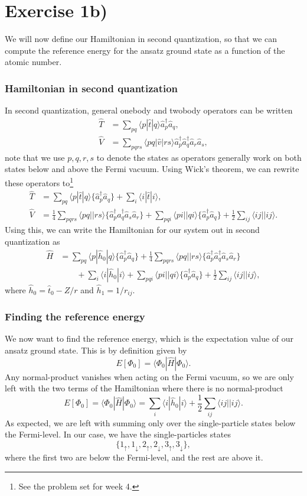 \documentclass[a4paper, 11pt, notitlepage, english]{article}
\newcommand{\brakket}[2]{\langle #1 || #2 \rangle}
\newcommand{\op}[1]{\hat{#1}}
\newcommand{\braopket}[3]{\langle #1 | {#2} | #3 \rangle}
\renewcommand{\d}{{\rm d}}
\renewcommand{\u}{\uparrow}
\renewcommand{\d}{\downarrow}
\begin{document}
\clearpage

\section*{Exercise 1b)}
We will now define our Hamiltonian in second quantization, so that we can compute the reference energy for the ansatz ground state as a function of the atomic number. 

\subsubsection*{Hamiltonian in second quantization}

In second quantization, general onebody and twobody operators can be written
\begin{align*}
\op{T} &= \sum_{pq} \braopket{p}{\op{t}}{q} \op{a}_p^\dagger \op{a}_q, \\
\op{V} &= \sum_{pqrs} \braopket{pq}{\op{v}}{rs} \op{a}_p^\dagger\op{a}_q^\dagger \op{a}_r \op{a}_s,
\end{align*}
note that we use $p,q,r,s$ to denote the states as operators generally work on both states below and above the Fermi vacuum. Using Wick's theorem, we can rewrite these operators to\footnote{See the problem set for week 4.}
\begin{align*}
\op{T} &= \sum_{pq} \braopket{p}{\op{t}}{q} \{\op{a}_p^\dagger \op{a}_q\} + \sum_i \braopket{i}{\op{t}}{i}, \\
\op{V} &= \frac{1}{4}\sum_{pqrs} \brakket{pq}{rs} \{\op{a}_p^\dag \op{a}_q^\dag \op{a}_s\op{a}_r\} + \sum_{pqi} \brakket{pi}{qi} \{ \op{a}_p^\dag \op{a}_q \} + \frac{1}{2}\sum_{ij} \brakket{ij}{ij}.
\end{align*}
Using this, we can write the Hamiltonian for our system out in second quantization as
\begin{align*}
\op{H} &= \sum_{pq} \braopket{p}{\op{h}_0}{q} \{\op{a}_p^\dagger \op{a}_q\} + \frac{1}{4}\sum_{pqrs} \brakket{pq}{rs}\{\op{a}_p^\dag \op{a}_q^\dag \op{a}_s\op{a}_r\} \\ &\qquad+ \sum_i \braopket{i}{\op{h}_0}{i} + \sum_{pqi} \brakket{pi}{qi} \{ \op{a}_p^\dag \op{a}_q \} + \frac{1}{2}\sum_{ij} \brakket{ij}{ij},
\end{align*}
where $\op{h}_0 = \op{t}_0 - Z/r$ and $\op{h}_1 = 1/r_{ij}$.

\subsubsection*{Finding the reference energy}
We now want to find the reference energy, which is the expectation value of our ansatz ground state. This is by definition given by
$$E[\Phi_0] = \braopket{\Phi_0}{\op{H}}{\Phi_0}.$$
Any normal-product vanishes when acting on the Fermi vacuum, so we are only left with the two terms of the Hamiltonian where there is no normal-product
$$E[\Phi_0] = \braopket{\Phi_0}{\op{H}}{\Phi_0} = \sum_{i}\braopket{i}{\op{h}_0}{i} + \frac{1}{2}\sum_{ij} \brakket{ij}{ij}.$$
As expected, we are left with summing only over the single-particle states below the Fermi-level. In our case, we have the single-particles states
$$\{1_\u, 1_\d, 2_\u, 2_\d, 3_\u, 3_\d \},$$
where the first two are below the Fermi-level, and the rest are above it.
\end{document}
